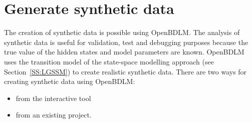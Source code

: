 \section{Generate synthetic data}
\label{S:SYNTHETIC}
The creation of synthetic data is possible using OpenBDLM.
The analysis of synthetic data is useful for validation, test and debugging purposes because the true value of the hidden states and model parameters are known.
OpenBDLM uses the transition model  of the state-space modelling approach (see Section~\ref{SS:LGSSM}) to create realistic synthetic data.
There are two ways for creating synthetic data using OpenBDLM:

\begin{itemize}
\item from the interactive tool
\item from an existing project.
\end{itemize}

